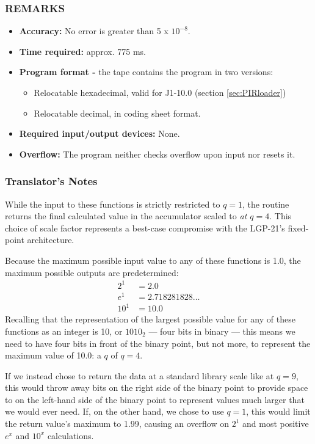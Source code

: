\subsubsection*{REMARKS}
\begin{itemize}
    \item \textbf{Accuracy:} No error is greater than 5 x $10^{-8}$.
    \item \textbf{Time required:} approx. 775 ms.
    \item \textbf{Program format -} the tape contains the program in two versions:
    \begin{itemize}
      \item Relocatable hexadecimal, valid for J1-10.0 (section \ref{sec:PIRloader})
        \item Relocatable decimal, in coding sheet format.
    \end{itemize}
    \item \textbf{Required input/output devices:} None.
    \item \textbf{Overflow:} The program neither checks overflow upon input nor resets it.
\end{itemize}

\subsubsection*{Translator's Notes}
While the input to these functions is strictly restricted to $q=1$, the routine returns the final calculated value in the accumulator scaled to \emph{at $q=4$}. This choice of scale factor represents a best-case compromise with the LGP-21's fixed-point architecture.

Because the maximum possible input value to any of these functions is 1.0, the maximum possible outputs are predetermined:
\begin{align*}
    2^1  &= 2.0 \\
    e^1  &= 2.718281828\dots \\
    10^1 &= 10.0
\end{align*}
Recalling that the representation of the largest possible value for any of these functions as an integer is 10, or $1010_2$ --- four bits in binary --- this means we need to have four bits in front of the binary point, but not more, to represent the maximum value of 10.0: a $q$ of $q=4$.

If we instead chose to return the data at a standard library scale like at $q=9$, this would throw away bits on the right side of the binary point to provide space to on the left-hand side of the binary point to represent values much larger that we would ever need. If, on the other hand, we chose to use $q=1$, this would limit the return value's maximum to 1.99, causing an overflow on $2^1$ and most positive $e^x$ and $10^x$ calculations.

